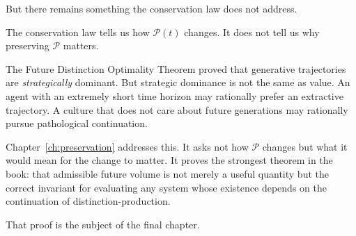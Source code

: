 \documentclass[12pt,twoside,openright]{book}
\begin{document}
But there remains something the conservation law
does not address.

The conservation law tells us how $\mathcal{P}(t)$
changes. It does not tell us why preserving
$\mathcal{P}$ matters.

The Future Distinction Optimality Theorem proved that
generative trajectories are \emph{strategically}
dominant. But strategic dominance is not the same
as value. An agent with an extremely short time horizon
may rationally prefer an extractive trajectory.
A culture that does not care about future generations
may rationally pursue pathological continuation.

Chapter~\ref{ch:preservation} addresses this.
It asks not how $\mathcal{P}$ changes but what it
would mean for the change to matter. It proves the
strongest theorem in the book: that admissible
future volume is not merely a useful quantity but
the correct invariant for evaluating any system
whose existence depends on the continuation of
distinction-production.

That proof is the subject of the final chapter.
\end{document}
